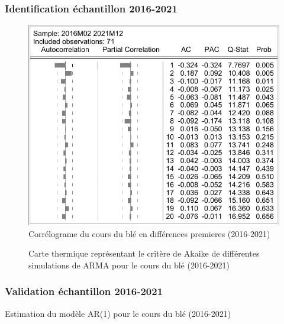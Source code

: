 \documentclass[12pt,a4paper]{article}
\begin{document}
\subsubsection{Identification échantillon 2016-2021}
\begin{figure}[H]
    \centering
    \includegraphics[]{annexe/4_3_2_cor_dble21.pdf}
    \caption{Corrélograme du cours du blé en différences premieres (2016-2021)}
    \label{fig:cor_dble21}
\end{figure}

\begin{figure}[H]
    \centering
    \resizebox{\textwidth}{!}{}
    \caption{Carte thermique représentant le critère de Akaike de différentes simulations de ARMA pour le cours du blé (2016-2021)}
    \label{fig:arma_heatmap_21}
\end{figure}

\subsubsection{Validation échantillon 2016-2021}\label{appendix:valid21}
\begin{table}[H]
    \centering
    \caption{Estimation du modèle AR(1) pour le cours du blé (2016-2021)}
    \sffamily
    \resizebox{0.8\textwidth}{!}{}

\end{table}
\end{document}
